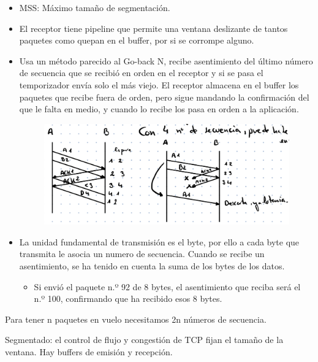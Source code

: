 \documentclass[12pt, twoside, openright]{report} %
\begin{document}
\begin{itemize}
	\item MSS: Máximo tamaño de segmentación.
	\item El receptor tiene pipeline que permite una ventana deslizante de
	      tantos paquetes como quepan en el buffer, por si se corrompe
	      alguno.
	\item Usa un método parecido al Go-back N, recibe asentimiento del
	      último número de secuencia que se recibió en orden en el receptor
	      y si se pasa el temporizador envía solo el más viejo. El receptor
	      almacena en el buffer los paquetes que recibe fuera de orden, pero
	      sigue mandando la confirmación del que le falta en medio, y cuando
	      lo recibe los pasa en orden a la aplicación.

	      \begin{figure}[H]
		      {\includegraphics[scale=.25]{Untitled 3.png}}
	      \end{figure}
	\item La unidad fundamental de transmisión es el byte, por ello a cada
	      byte que transmita le asocia un numero de secuencia. Cuando se
	      recibe un asentimiento, se ha tenido en cuenta la suma de los
	      bytes de los datos.

	      \begin{itemize}
		      \item Si envió el paquete n.º 92 de 8 bytes, el asentimiento que reciba
		            será el n.º 100, confirmando que ha recibido esos 8 bytes.
	      \end{itemize}
\end{itemize}

Para tener n paquetes en vuelo necesitamos 2n números de secuencia.

Segmentado: el control de flujo y congestión de TCP fijan el tamaño
de la ventana. Hay buffers de emisión y recepción.
\end{document}
